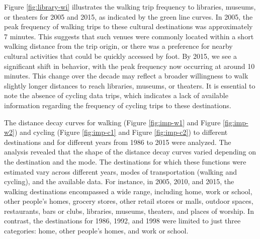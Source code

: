 \documentclass[
11pt, %
oneside, %
english, %
singlespacing, %
]{macthesis} %
\begin{document}
Figure \ref{fig:library-wi} illustrates the walking trip frequency to libraries, museums, or theaters for 2005 and 2015, as indicated by the green line curves. In 2005, the peak frequency of walking trips to these cultural destinations was approximately 7 minutes. This suggests that such venues were commonly located within a short walking distance from the trip origin, or there was a preference for nearby cultural activities that could be quickly accessed by foot. By 2015, we see a significant shift in behavior, with the peak frequency now occurring at around 10 minutes. This change over the decade may reflect a broader willingness to walk slightly longer distances to reach libraries, museums, or theaters. It is essential to note the absence of cycling data trips, which indicates a lack of available information regarding the frequency of cycling trips to these destinations.

The distance decay curves for walking (Figure \ref{fig:imp-w1} and Figure \ref{fig:imp-w2}) and cycling (Figure \ref{fig:imp-c1} and Figure \ref{fig:imp-c2}) to different destinations and for different years from 1986 to 2015 were analyzed. The analysis revealed that the shape of the distance decay curves varied depending on the destination and the mode. The destinations for which these functions were estimated vary across different years, modes of transportation (walking and cycling), and the available data. For instance, in 2005, 2010, and 2015, the walking destinations encompassed a wide range, including home, work or school, other people's homes, grocery stores, other retail stores or malls, outdoor spaces, restaurants, bars or clubs, libraries, museums, theaters, and places of worship. In contrast, the destinations for 1986, 1992, and 1998 were limited to just three categories: home, other people's homes, and work or school.
\end{document}

